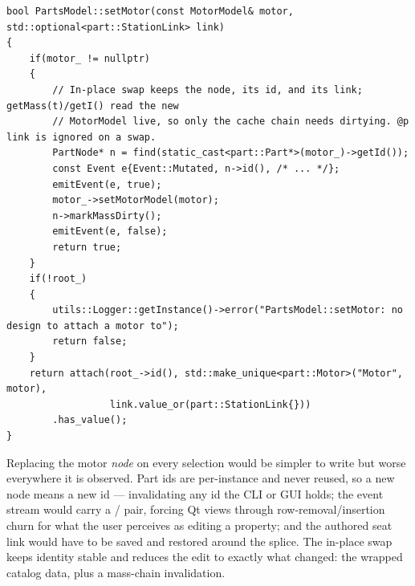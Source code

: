 \begin{listing}[htbp]
\begin{verbatim}
bool PartsModel::setMotor(const MotorModel& motor, std::optional<part::StationLink> link)
{
    if(motor_ != nullptr)
    {
        // In-place swap keeps the node, its id, and its link; getMass(t)/getI() read the new
        // MotorModel live, so only the cache chain needs dirtying. @p link is ignored on a swap.
        PartNode* n = find(static_cast<part::Part*>(motor_)->getId());
        const Event e{Event::Mutated, n->id(), /* ... */};
        emitEvent(e, true);
        motor_->setMotorModel(motor);
        n->markMassDirty();
        emitEvent(e, false);
        return true;
    }
    if(!root_)
    {
        utils::Logger::getInstance()->error("PartsModel::setMotor: no design to attach a motor to");
        return false;
    }
    return attach(root_->id(), std::make_unique<part::Motor>("Motor", motor),
                  link.value_or(part::StationLink{}))
        .has_value();
}
\end{verbatim}
\caption{ (, elided). First call:
an ordinary attach under the root. Every later call: an in-place swap of the wrapped
, presented to observers as a  edit on an unchanged
node.}\label{lst:motor-setmotor}
\end{listing}


\begin{rejected}
Replacing the motor \emph{node} on every selection would be simpler to write but worse everywhere
it is observed. Part ids are per-instance and never reused, so a new node means a new id ---
invalidating any id the CLI or GUI holds; the event stream would carry a
/ pair, forcing Qt views through row-removal/insertion churn for
what the user perceives as editing a property; and the authored seat link would have to be saved
and restored around the splice. The in-place swap keeps identity stable and reduces the edit to
exactly what changed: the wrapped catalog data, plus a mass-chain invalidation.
\end{rejected}

